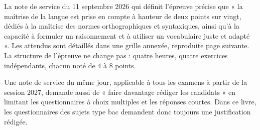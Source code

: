 
\thispagestyle{otFront}
\label{maitrise-langue}%
%

{\fontsize{10.5}{14.5}\selectfont
{}
La note de service du 11 septembre 2026 qui définit l'épreuve précise que « la maîtrise de la langue est prise en compte à
hauteur de deux points sur vingt, dédiés à la maîtrise des normes orthographiques et syntaxiques, ainsi qu'à la capacité à
formuler un raisonnement et à utiliser un vocabulaire juste et adapté ». Les attendus sont détaillés dans une grille annexée,
reproduite page suivante. La structure de l'épreuve ne change pas : quatre heures, quatre exercices indépendants, chacun noté
de $4$ à $8$ points.\par\vspace{3mm}
Une note de service du même jour, applicable à tous les examens à partir de la session 2027, demande aussi de « faire
davantage rédiger les candidats » en limitant les questionnaires à choix multiples et les réponses courtes. Dans ce livre, les
questionnaires des sujets type bac demandent donc toujours une justification rédigée.\par}

